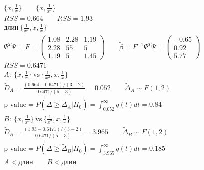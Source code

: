\documentclass{article}
\begin{document}
\begin{eg}
  \begin{gather*}
    \{x, \frac{1}{x}\} \qquad \{x, \frac{1}{x^{2}} \} \\ 
    RSS = 0.664 \qquad RSS=1.93 \\ 
  \text{длин} \ \{\frac{1}{x^{2}}, x, \frac{1}{x}\} \\ 
  \Psi^{T}\Psi = F = \begin{pmatrix}
    1.08 & 2.28 & 1.19 \\ 
    2.28 & 55 & 5 \\ 
    1.19 & 5 & 1.45
  \end{pmatrix} \qquad \tilde{\beta} = F^{-1}\Psi^{T}\Psi = \begin{pmatrix}
    -0.65 \\ 0.92 \\ 5.77
  \end{pmatrix} \\ 
  RSS=0.6471 \\ 
  A: \: \{x, \frac{1}{x}\} \ \text{vs} \ \{\frac{1}{x^{2}}, x, \frac{1}{x}\} \\ 
  \tilde{D}_A = \frac{(0.664 - 0.6471)/(3-2)}{0.6471/(5-3)}=0.052 \qquad \tilde{\Delta}_A \sim F(1,2) \\ 
  \text{p-value}=P(\Delta \ge \tilde{\Delta}_A|H_0)=\int_{0.052}^{\infty}q(t)dt = 0.84 \\
  B: \: \{x, \frac{1}{x^{2}}\} \ \text{vs} \ \{\frac{1}{x^{2}}, x, \frac{1}{x}\} \\ 
  \tilde{D}_B = \frac{(1.93 - 0.6471)/(3-2)}{0.6471/(5-3)}=3.965 \qquad \tilde{\Delta}_B \sim F(1,2) \\ 
  \text{p-value}=P(\Delta \ge \tilde{\Delta}_B|H_0)=\int_{3.965}^{\infty}q(t)dt = 0.185 \\ 
  A < \text{длин} \qquad B < \text{длин}
  \end{gather*}
\end{eg}
\end{document}
